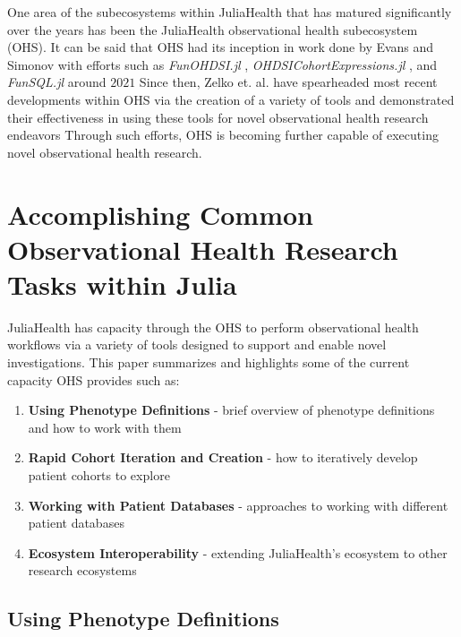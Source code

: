 \documentclass{juliacon}
\begin{document}
One area of the subecosystems within JuliaHealth that has matured significantly over the years has been the JuliaHealth observational health subecosystem (OHS).
It can be said that OHS had its inception in work done by Evans and Simonov with efforts such as \textit{FunOHDSI.jl} \cite{evansFunOHDSIJl2022}, \textit{OHDSICohortExpressions.jl} \cite{evansOHDSICohortExpressionsJl2023}, and \textit{FunSQL.jl} around $2021$ \cite{kirill_simonov_2023_7705325}
Since then, Zelko et. al. have spearheaded most recent developments within OHS via the creation of a variety of tools and demonstrated their effectiveness in using these tools for novel observational health research endeavors \cite{zelko2022pilot}
Through such efforts, OHS is becoming further capable of executing novel observational health research. 

\section{Accomplishing Common Observational Health Research Tasks within Julia}

JuliaHealth has capacity through the OHS to perform observational health workflows via a variety of tools designed to support and enable novel investigations.
This paper summarizes and highlights some of the current capacity OHS provides such as:

\begin{enumerate}
\item \textbf{Using Phenotype Definitions} - brief overview of phenotype definitions and how to work with them
\item \textbf{Rapid Cohort Iteration and Creation} - how to iteratively develop patient cohorts to explore
\item \textbf{Working with Patient Databases} - approaches to working with different patient databases
\item \textbf{Ecosystem Interoperability} - extending JuliaHealth's ecosystem to other research ecosystems
\end{enumerate}

\subsection{Using Phenotype Definitions}
\end{document}
